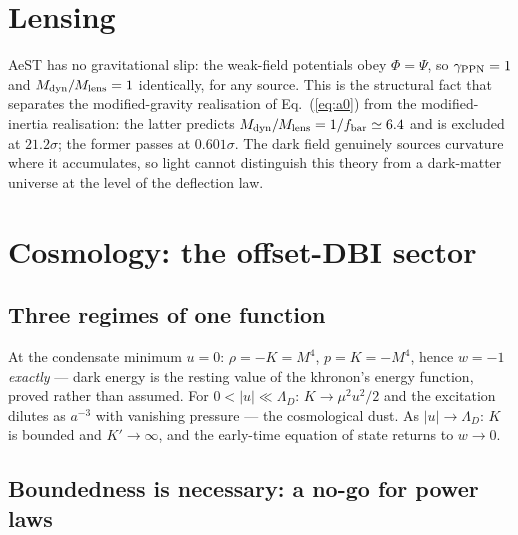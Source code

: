 \documentclass[aps,prd,twocolumn,10pt,nofootinbib,superscriptaddress]{revtex4-2}
\begin{document}
\section{Lensing}
\label{sec:lensing}

AeST has no gravitational slip: the weak-field potentials obey $\Phi=\Psi$, so
$\gamma_{\rm PPN}=1$ and $M_{\rm dyn}/M_{\rm lens}=1$ identically, for any source. This is the
structural fact that separates the modified-gravity realisation of Eq.~(\ref{eq:a0}) from the
modified-inertia realisation: the latter predicts $M_{\rm dyn}/M_{\rm lens}=1/f_{\rm bar}\simeq6.4$
and is excluded at $21.2\sigma$; the former passes at $0.601\sigma$. The dark field genuinely
sources curvature where it accumulates, so light cannot distinguish this theory from a dark-matter
universe at the level of the deflection law.

\section{Cosmology: the offset-DBI sector}
\label{sec:cosmology}

\subsection{Three regimes of one function}

At the condensate minimum $u=0$: $\rho=-K=M^4$, $p=K=-M^4$, hence $w=-1$ \emph{exactly} --- dark
energy is the resting value of the khronon's energy function, proved rather than assumed. For
$0<|u|\ll\Lambda_D$: $K\to\mu^2u^2/2$ and the excitation dilutes as $a^{-3}$ with vanishing
pressure --- the cosmological dust. As $|u|\to\Lambda_D$: $K$ is bounded and $K'\to\infty$, and the
early-time equation of state returns to $w\to0$.

\subsection{Boundedness is necessary: a no-go for power laws}
\end{document}
